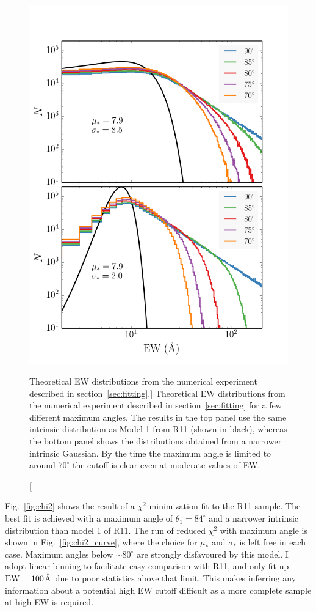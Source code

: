 \begin{figure}
\centering
\includegraphics[width=1.0\textwidth]{figures/ewpaper/cutoff.png}
\caption
[Theoretical EW distributions from the numerical experiment 
described in section~\ref{sec:fitting}.]
{
Theoretical EW distributions from the numerical experiment 
described in section~\ref{sec:fitting} for a few different 
maximum angles. The results in the top panel use the same intrinsic
distribution as Model 1 from R11 (shown in black), 
whereas the bottom panel shows the distributions 
obtained from a narrower intrinsic Gaussian. By the time the maximum
angle is limited to around $70^\circ$ the cutoff is
clear even at moderate values of EW.
}
\label{fig:cutoff}
\end{figure}

Fig.~\ref{fig:chi2} shows the result of a $\chi^2$ minimization fit 
to the R11 sample. The best fit is achieved with a maximum angle of 
$\theta_{1}=84^\circ$ and a narrower intrinsic distribution
than model 1 of R11. The run of reduced $\chi^2$ with maximum angle
is shown in Fig.~\ref{fig:chi2_curve}, where the choice for $\mu_*$
and $\sigma_*$ is left free in each case. 
Maximum angles below $\sim80^\circ$ are strongly disfavoured
by this model. I adopt linear binning to facilitate easy comparison 
with R11, and only fit up ${\rm EW}=100$\AA\
due to poor statistics above that limit. This 
makes inferring any information about a potential high EW cutoff 
difficult as a more complete sample at high EW is required. 

